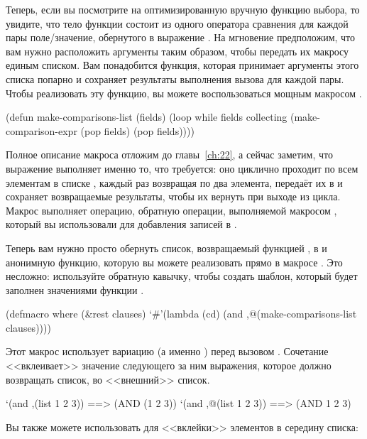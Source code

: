 Теперь, если вы посмотрите на оптимизированную вручную функцию выбора, то увидите, что
тело функции состоит из одного оператора сравнения для каждой пары поле/значение,
обернутого в выражение . На мгновение предположим, что вам нужно расположить
аргументы таким образом, чтобы передать их макросу  единым списком. Вам
понадобится функция, которая принимает аргументы этого списка попарно и сохраняет
результаты выполнения вызова  для каждой пары. Чтобы
реализовать эту функцию, вы можете воспользоваться мощным макросом .

\begin{myverb}
(defun make-comparisons-list (fields)
  (loop while fields
     collecting (make-comparison-expr (pop fields) (pop fields))))
\end{myverb}

Полное описание макроса  отложим до главы~\ref{ch:22}, а сейчас заметим, что выражение
 выполняет именно то, что требуется: оно циклично проходит по всем элементам в
списке , каждый раз возвращая по два элемента, передаёт их в
 и сохраняет возвращаемые результаты, чтобы их вернуть при
выходе из цикла. Макрос  выполняет операцию, обратную операции, выполняемой макросом
, который вы использовали для добавления записей в .

Теперь вам нужно просто обернуть список, возвращаемый функцией ,
в  и анонимную функцию, которую вы можете реализовать прямо в макросе
. Это несложно: используйте обратную кавычку, чтобы создать шаблон, который
будет заполнен значениями функции .

\begin{myverb}
(defmacro where (&rest clauses)
  `#'(lambda (cd) (and ,@(make-comparisons-list clauses))))
\end{myverb}

Этот макрос использует вариацию \code{,} (а именно ) перед вызовом
. Сочетание  <<вклеивает>> значение следующего за ним
выражения, которое должно возвращать список, во <<внешний>> список.

\begin{myverb}
  `(and ,(list 1 2 3))  ==> (AND (1 2 3))
  `(and ,@(list 1 2 3)) ==> (AND 1 2 3)
\end{myverb}

Вы также можете использовать  для <<вклейки>> элементов в середину списка:

